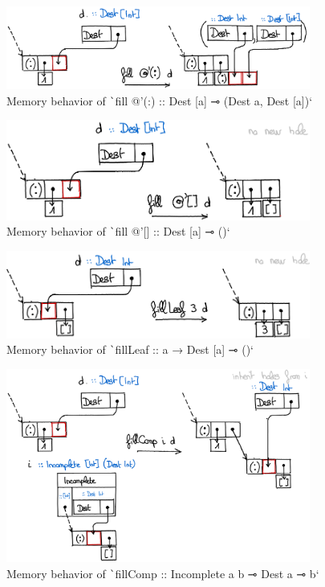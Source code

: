 \documentclass[english]{jflart}
\begin{document}
\begin{figure}[t]\centering
  \includegraphics[width=10cm]{fillCons.png}
  \caption{Memory behavior of \texttt`fill @'(:) :: Dest [a] ⊸ (Dest a, Dest [a])`}
  \label{fig:schema-fillCons}
\end{figure}

\begin{figure}[t]\centering
  \includegraphics[width=10cm]{fillNil.png}
  \caption{Memory behavior of \texttt`fill @'[] :: Dest [a] ⊸ ()`}
  \label{fig:schema-fillNil}
\end{figure}

\begin{figure}[t]\centering
  \includegraphics[width=10cm]{fillLeaf.png}
  \caption{Memory behavior of \texttt`fillLeaf :: a → Dest [a] ⊸ ()`}
  \label{fig:schema-fillLeaf}
\end{figure}

\begin{figure}[t]\centering
  \includegraphics[width=10cm]{fillComp.png}
  \caption{Memory behavior of \texttt`fillComp :: Incomplete a b ⊸ Dest a ⊸ b`}
  \label{fig:schema-fillComp}
\end{figure}
\end{document}
